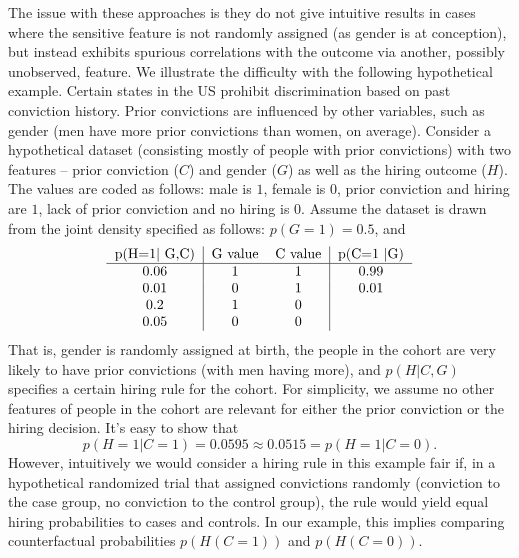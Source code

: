 \documentclass[letterpaper]{article} %
\begin{document}
The issue with these approaches is they do not give intuitive results in cases where the sensitive feature is not randomly assigned (as gender is at conception), but instead exhibits spurious correlations with the outcome via another, possibly unobserved, feature.  We illustrate the difficulty with the following hypothetical example.  Certain states in the US prohibit discrimination based on past conviction history.  Prior convictions are influenced by other variables, such as gender (men have more prior convictions than women, on average). Consider a hypothetical dataset (consisting mostly of people with prior convictions) with two features -- prior conviction ($C$) and gender ($G$) as well as the hiring outcome ($H$). The values are coded as follows: male is $1$, female is $0$, prior conviction and hiring are $1$, lack of prior conviction and no hiring is $0$.  Assume the dataset is drawn from the joint density specified as follows: $p(G = 1) = 0.5$, and
{\small
\begin{align*}
\begin{tabular}{c|cc|c}
p(H=1| G,C) & G value & C value & p(C=1 |G) \\
\hline
0.06 & 1 & 1 & 0.99 \\
0.01 & 0 & 1 & 0.01 \\
0.2 & 1 & 0 &  \\
0.05 & 0 & 0 & \\
\end{tabular}%
\end{align*}
}
That is, gender is randomly assigned at birth, the people in the cohort are very likely to have prior convictions (with men having more), and $p(H | C,G)$ specifies a certain hiring rule for the cohort.  For simplicity, we assume no other features of people in the cohort are relevant for either the prior conviction or the hiring decision. It's easy to show that
\[
p(H=1 | C=1) = 0.0595 \approx 0.0515 = p(H=1 | C=0).
\]
However, intuitively we would consider a hiring rule in this example fair if, in a hypothetical randomized trial that assigned convictions randomly (conviction to the case group, no conviction to the control group), the rule would yield equal hiring probabilities to cases and controls. In our example, this implies comparing counterfactual probabilities $p(H(C=1))$ and $p(H(C=0))$. 
\end{document}

